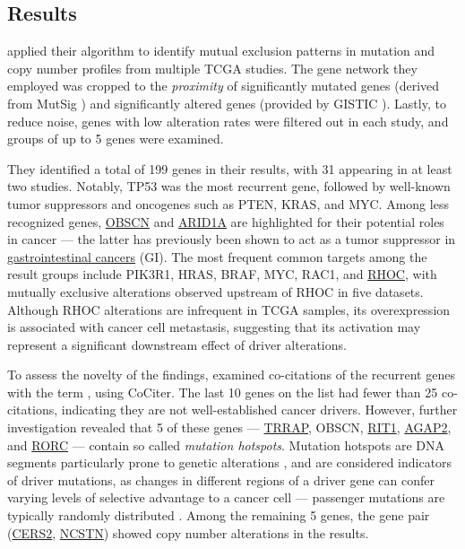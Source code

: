 \subsection{Results}

\textcite{mutex} applied their algorithm to identify mutual exclusion patterns in mutation and copy number profiles from multiple TCGA studies. The gene network they employed was cropped to the \textit{proximity} of significantly mutated genes (derived from MutSig \cite{mutsig}) and significantly altered genes (provided by GISTIC \cite{gistic}). Lastly, to reduce noise, genes with low alteration rates were filtered out in each study, and groups of up to 5 genes were examined.

They identified a total of 199 genes in their results, with 31 appearing in at least two studies. Notably, TP53 was the most recurrent gene, followed by well-known tumor suppressors and oncogenes such as PTEN, KRAS, and MYC. Among less recognized genes, \href{https://www.ncbi.nlm.nih.gov/gene/84033}{OBSCN} and \href{https://www.ncbi.nlm.nih.gov/gene/8289}{ARID1A} are highlighted for their potential roles in cancer --- the latter has previously been shown to act as a tumor suppressor in \href{https://en.wikipedia.org/wiki/Gastrointestinal_cancer}{gastrointestinal cancers} (GI). The most frequent common targets among the result groups include PIK3R1, HRAS, BRAF, MYC, RAC1, and \href{https://www.ncbi.nlm.nih.gov/gene/389}{RHOC}, with mutually exclusive alterations observed upstream of RHOC in five datasets. Although RHOC alterations are infrequent in TCGA samples, its overexpression is associated with cancer cell metastasis, suggesting that its activation may represent a significant downstream effect of driver alterations.

To assess the novelty of the findings, \textcite{mutex} examined co-citations of the recurrent genes with the term , using CoCiter. The last 10 genes on the list had fewer than 25 co-citations, indicating they are not well-established cancer drivers. However, further investigation revealed that 5 of these genes --- \href{https://www.ncbi.nlm.nih.gov/gene/8295}{TRRAP}, OBSCN, \href{https://www.ncbi.nlm.nih.gov/gene/6016}{RIT1}, \href{https://www.ncbi.nlm.nih.gov/gene/116986}{AGAP2}, and \href{https://www.ncbi.nlm.nih.gov/gene/6097}{RORC} --- contain so called \textit{mutation hotspots}. Mutation hotspots are DNA segments particularly prone to genetic alterations \cite{mutation_hotspot}, and are considered indicators of driver mutations, as changes in different regions of a driver gene can confer varying levels of selective advantage to a cancer cell --- passenger mutations are typically randomly distributed \cite{mutex}. Among the remaining 5 genes, the gene pair (\href{https://www.ncbi.nlm.nih.gov/gene/29956}{CERS2}, \href{https://www.ncbi.nlm.nih.gov/gene/23385}{NCSTN}) showed copy number alterations in the results.

